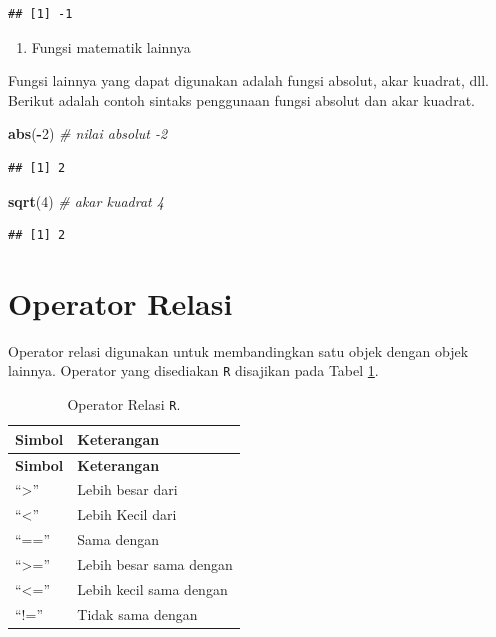 \documentclass[]{book}
\newenvironment{Shaded}{\begin{snugshade}}{\end{snugshade}}
\newcommand{\KeywordTok}[1]{\textcolor[rgb]{0.13,0.29,0.53}{\textbf{#1}}}
\newcommand{\DecValTok}[1]{\textcolor[rgb]{0.00,0.00,0.81}{#1}}
\newcommand{\CommentTok}[1]{\textcolor[rgb]{0.56,0.35,0.01}{\textit{#1}}}
\newcommand{\OperatorTok}[1]{\textcolor[rgb]{0.81,0.36,0.00}{\textbf{#1}}}
\newcommand{\NormalTok}[1]{#1}
\providecommand{\tightlist}{%
  \setlength{\itemsep}{0pt}\setlength{\parskip}{0pt}}
\begin{document}
\begin{verbatim}
## [1] -1
\end{verbatim}

\begin{enumerate}
\def\labelenumi{\arabic{enumi}.}
\setcounter{enumi}{2}
\tightlist
\item
  Fungsi matematik lainnya
\end{enumerate}

Fungsi lainnya yang dapat digunakan adalah fungsi absolut, akar kuadrat,
dll. Berikut adalah contoh sintaks penggunaan fungsi absolut dan akar
kuadrat.

\begin{Shaded}
\begin{Highlighting}[]
\KeywordTok{abs}\NormalTok{(}\OperatorTok{-}\DecValTok{2}\NormalTok{) }\CommentTok{# nilai absolut -2}
\end{Highlighting}
\end{Shaded}

\begin{verbatim}
## [1] 2
\end{verbatim}

\begin{Shaded}
\begin{Highlighting}[]
\KeywordTok{sqrt}\NormalTok{(}\DecValTok{4}\NormalTok{) }\CommentTok{# akar kuadrat 4}
\end{Highlighting}
\end{Shaded}

\begin{verbatim}
## [1] 2
\end{verbatim}

\section{Operator Relasi}\label{operator-relasi}

Operator relasi digunakan untuk membandingkan satu objek dengan objek
lainnya. Operator yang disediakan \texttt{R} disajikan pada Tabel
\ref{tab:oprelasi}.

\begin{longtable}[]{@{}ll@{}}
\caption{\label{tab:oprelasi} Operator Relasi \texttt{R}.}\tabularnewline
\toprule
\textbf{Simbol} & \textbf{Keterangan}\tabularnewline
\midrule
\endfirsthead
\toprule
\textbf{Simbol} & \textbf{Keterangan}\tabularnewline
\midrule
\endhead
``\textgreater{}'' & Lebih besar dari\tabularnewline
``\textless{}'' & Lebih Kecil dari\tabularnewline
``=='' & Sama dengan\tabularnewline
``\textgreater{}='' & Lebih besar sama dengan\tabularnewline
``\textless{}='' & Lebih kecil sama dengan\tabularnewline
``!='' & Tidak sama dengan\tabularnewline
\bottomrule
\end{longtable}
\end{document}
